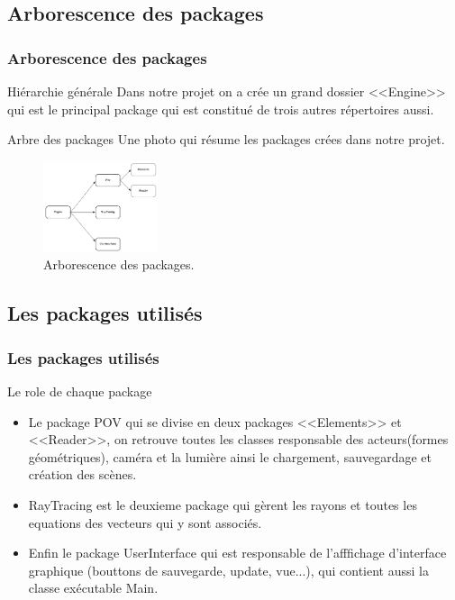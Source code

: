 \documentclass{beamer}
\begin{document}
	\subsection{Arborescence des packages}
		\begin{frame}
		\frametitle{Arborescence des packages}
			\begin{block}{Hiérarchie générale}
			Dans notre projet on a crée un grand dossier <<Engine>> qui est le principal package qui est constitué de trois autres répertoires aussi.
			\end{block}	
			\begin{exampleblock}{Arbre des packages} 
				Une photo qui résume les packages crées dans notre projet.
				\begin{figure}[h]
                    \begin{center}
                    \includegraphics[width=0.3\textwidth]{./images/Arborescence.png}
                    \end{center}
                    \caption{Arborescence des packages.}
                    \label{fig}
                \end{figure}
			\end{exampleblock}	
		\end{frame}
	\subsection{Les packages utilisés}
		\begin{frame}
		\frametitle{Les packages utilisés}
			\begin{block}{Le role de chaque package}
				\begin{itemize}
					\item Le package POV qui se divise en deux packages <<Elements>> et <<Reader>>, on retrouve toutes les classes responsable des acteurs(formes géométriques), caméra et la lumière ainsi le chargement, sauvegardage et création des scènes.
					\item RayTracing est le deuxieme package qui gèrent les rayons et toutes les equations des vecteurs qui y sont associés.
					\item Enfin le package UserInterface qui est responsable de l'afffichage d'interface graphique (bouttons de sauvegarde, update, vue...), qui contient aussi la classe exécutable Main.
				\end{itemize}
			\end{block}
		\end{frame}
\end{document}
